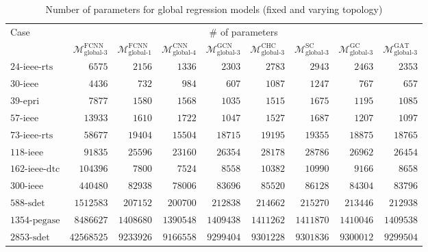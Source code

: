 \documentclass[journal]{IEEEtran}
\begin{document}
\begin{table*}[!ht]
\small
\caption{Number of parameters for global regression models (fixed and varying topology)}
\label{tab:params_reg_global}
\def\na{---}
\centering
    \begin{tabular}{lr|rrrrrrr}
    \toprule
    \multirow{2}{*}{Case} & \multicolumn{8}{c}{\# of parameters} \\ 
    \cmidrule(r){2-9}
    & $\mathcal{M}^{\textrm{FCNN}}_{\textrm{global-3}}$ & $\mathcal{M}^{\textrm{FCNN}}_{\textrm{global-1}}$ & $\mathcal{M}^{\textrm{CNN}}_{\textrm{global-4}}$ & $\mathcal{M}^{\textrm{GCN}}_{\textrm{global-3}}$ & $\mathcal{M}^{\textrm{CHC}}_{\textrm{global-3}}$ & $\mathcal{M}^{\textrm{SC}}_{\textrm{global-3}}$ & $\mathcal{M}^{\textrm{GC}}_{\textrm{global-3}}$ & $\mathcal{M}^{\textrm{GAT}}_{\textrm{global-3}}$ \\
    \midrule
    $\textrm{24-ieee-rts}$ & $6575$ & $2156$ & $1336$ & $2303$ & $2783$ & $2943$ & $2463$ & $2353$ \\
    $\textrm{30-ieee}$ & $4436$ & $732$ & $984$ & $607$ & $1087$ & $1247$ & $767$ & $657$ \\
    $\textrm{39-epri}$ & $7877$ & $1580$ & $1568$ & $1035$ & $1515$ & $1675$ & $1195$ & $1085$ \\
    $\textrm{57-ieee}$ & $13933$ & $1610$ & $1722$ & $1047$ & $1527$ & $1687$ & $1207$ & $1097$ \\
    $\textrm{73-ieee-rts}$ & $58677$ & $19404$ & $15504$ & $18715$ & $19195$ & $19355$ & $18875$ & $18765$ \\
    $\textrm{118-ieee}$ & $91835$ & $25596$ & $23160$ & $26354$ & $28178$ & $28786$ & $26962$ & $26454$ \\
    $\textrm{162-ieee-dtc}$ & $104396$ & $7800$ & $7524$ & $8558$ & $10382$ & $10990$ & $9166$ & $8658$ \\
    $\textrm{300-ieee}$ & $440480$ & $82938$ & $78006$ & $83696$ & $85520$ & $86128$ & $84304$ & $83796$ \\
    $\textrm{588-sdet}$ & $1512583$ & $207152$ & $200700$ & $212838$ & $214662$ & $215270$ & $213446$ & $212938$ \\
    $\textrm{1354-pegase}$ & $8486627$ & $1408680$ & $1390548$ & $1409438$ & $1411262$ & $1411870$ & $1410046$ & $1409538$ \\
    $\textrm{2853-sdet}$ & $42568525$ & $9233926$ & $9166558$ & $9299404$ & $9301228$ & $9301836$ & $9300012$ & $9299504$ \\
    \bottomrule
    \end{tabular}
\end{table*}
\end{document}
